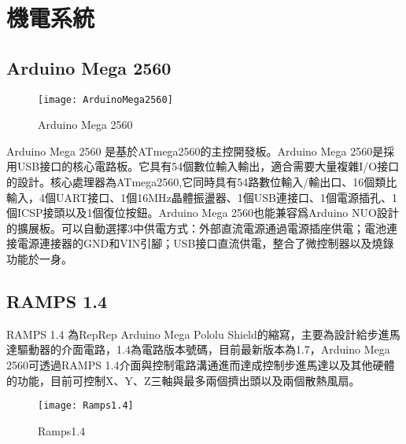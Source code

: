 \chapter{機電系統}
\section{Arduino Mega 2560}
\begin{figure}[hbt!]
\begin{center}
\texttt{[image: ArduinoMega2560]}
\caption{\Large Arduino Mega 2560}\label{ArduinoMega2560}
\end{center}
\end{figure}
 Arduino Mega 2560 是基於ATmega2560的主控開發板。Arduino Mega 2560是採用USB接口的核心電路板。它具有54個數位輸入輸出，適合需要大量複雜I/O接口的設計。核心處理器為ATmega2560,它同時具有54路數位輸入/輸出口、16個類比輸入，4個UART接口、1個16MHz晶體振盪器、1個USB連接口、1個電源插孔、1個ICSP接頭以及1個復位按鈕。Arduino Mega 2560也能兼容爲Arduino NUO設計的擴展板。可以自動選擇3中供電方式：外部直流電源通過電源插座供電；電池連接電源連接器的GND和VIN引腳；USB接口直流供電，整合了微控制器以及燒錄功能於一身。\\[6pt]

\section{RAMPS 1.4}
 RAMPS 1.4 為RepRep Arduino Mega Pololu Shield的縮寫，主要為設計給步進馬達驅動器的介面電路，1.4為電路版本號碼，目前最新版本為1.7，Arduino Mega 2560可透過RAMPS 1.4介面與控制電路溝通進而達成控制步進馬達以及其他硬體的功能，目前可控制X、Y、Z三軸與最多兩個擠出頭以及兩個散熱風扇。\\
\begin{figure}[hbt!]
\begin{center}
\texttt{[image: Ramps1.4]}
\caption{\Large Ramps1.4}\label{Ramps1.4}
\end{center}
\end{figure}

\newpage 